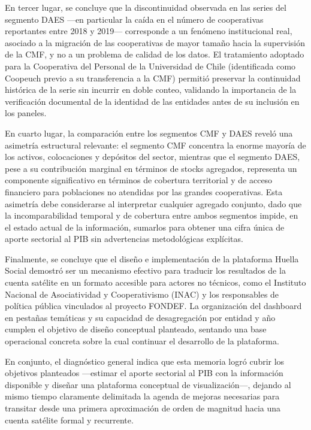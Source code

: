 En tercer lugar, se concluye que la discontinuidad observada en las series del segmento DAES —en particular la caída en el número de cooperativas reportantes entre 2018 y 2019— corresponde a un fenómeno institucional real, asociado a la migración de las cooperativas de mayor tamaño hacia la supervisión de la CMF, y no a un problema de calidad de los datos. El tratamiento adoptado para la Cooperativa del Personal de la Universidad de Chile (identificada como Coopeuch previo a su transferencia a la CMF) permitió preservar la continuidad histórica de la serie sin incurrir en doble conteo, validando la importancia de la verificación documental de la identidad de las entidades antes de su inclusión en los paneles.

En cuarto lugar, la comparación entre los segmentos CMF y DAES reveló una asimetría estructural relevante: el segmento CMF concentra la enorme mayoría de los activos, colocaciones y depósitos del sector, mientras que el segmento DAES, pese a su contribución marginal en términos de stocks agregados, representa un componente significativo en términos de cobertura territorial y de acceso financiero para poblaciones no atendidas por las grandes cooperativas. Esta asimetría debe considerarse al interpretar cualquier agregado conjunto, dado que la incomparabilidad temporal y de cobertura entre ambos segmentos impide, en el estado actual de la información, sumarlos para obtener una cifra única de aporte sectorial al PIB sin advertencias metodológicas explícitas.

Finalmente, se concluye que el diseño e implementación de la plataforma Huella Social demostró ser un mecanismo efectivo para traducir los resultados de la cuenta satélite en un formato accesible para actores no técnicos, como el Instituto Nacional de Asociatividad y Cooperativismo (INAC) y los responsables de política pública vinculados al proyecto FONDEF. La organización del dashboard en pestañas temáticas y su capacidad de desagregación por entidad y año cumplen el objetivo de diseño conceptual planteado, sentando una base operacional concreta sobre la cual continuar el desarrollo de la plataforma.

En conjunto, el diagnóstico general indica que esta memoria logró cubrir los objetivos planteados —estimar el aporte sectorial al PIB con la información disponible y diseñar una plataforma conceptual de visualización—, dejando al mismo tiempo claramente delimitada la agenda de mejoras necesarias para transitar desde una primera aproximación de orden de magnitud hacia una cuenta satélite formal y recurrente.

